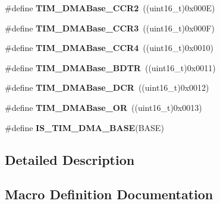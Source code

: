 \begin{DoxyCompactItemize}
\item 
\#define {\bfseries T\+I\+M\+\_\+\+D\+M\+A\+Base\+\_\+\+C\+C\+R2}~((uint16\+\_\+t)0x000\+E)\hypertarget{group___t_i_m___d_m_a___base__address_ga0e2150dcd3afe31ecb793aa471b3b972}{}\label{group___t_i_m___d_m_a___base__address_ga0e2150dcd3afe31ecb793aa471b3b972}

\item 
\#define {\bfseries T\+I\+M\+\_\+\+D\+M\+A\+Base\+\_\+\+C\+C\+R3}~((uint16\+\_\+t)0x000\+F)\hypertarget{group___t_i_m___d_m_a___base__address_ga590c90085bd2b206b941dff2731fed74}{}\label{group___t_i_m___d_m_a___base__address_ga590c90085bd2b206b941dff2731fed74}

\item 
\#define {\bfseries T\+I\+M\+\_\+\+D\+M\+A\+Base\+\_\+\+C\+C\+R4}~((uint16\+\_\+t)0x0010)\hypertarget{group___t_i_m___d_m_a___base__address_ga5e84a16e7d8ea369a3a55bb6fe1f2171}{}\label{group___t_i_m___d_m_a___base__address_ga5e84a16e7d8ea369a3a55bb6fe1f2171}

\item 
\#define {\bfseries T\+I\+M\+\_\+\+D\+M\+A\+Base\+\_\+\+B\+D\+TR}~((uint16\+\_\+t)0x0011)\hypertarget{group___t_i_m___d_m_a___base__address_gaaff22bbf3091c47783c1c68b648c8605}{}\label{group___t_i_m___d_m_a___base__address_gaaff22bbf3091c47783c1c68b648c8605}

\item 
\#define {\bfseries T\+I\+M\+\_\+\+D\+M\+A\+Base\+\_\+\+D\+CR}~((uint16\+\_\+t)0x0012)\hypertarget{group___t_i_m___d_m_a___base__address_ga59e2206e4e03b9d55c9fb5a24e29b01c}{}\label{group___t_i_m___d_m_a___base__address_ga59e2206e4e03b9d55c9fb5a24e29b01c}

\item 
\#define {\bfseries T\+I\+M\+\_\+\+D\+M\+A\+Base\+\_\+\+OR}~((uint16\+\_\+t)0x0013)\hypertarget{group___t_i_m___d_m_a___base__address_gad6a75d19df73bae091a0e649fba7339c}{}\label{group___t_i_m___d_m_a___base__address_gad6a75d19df73bae091a0e649fba7339c}

\item 
\#define {\bfseries I\+S\+\_\+\+T\+I\+M\+\_\+\+D\+M\+A\+\_\+\+B\+A\+SE}(B\+A\+SE)
\end{DoxyCompactItemize}


\subsection{Detailed Description}


\subsection{Macro Definition Documentation}
